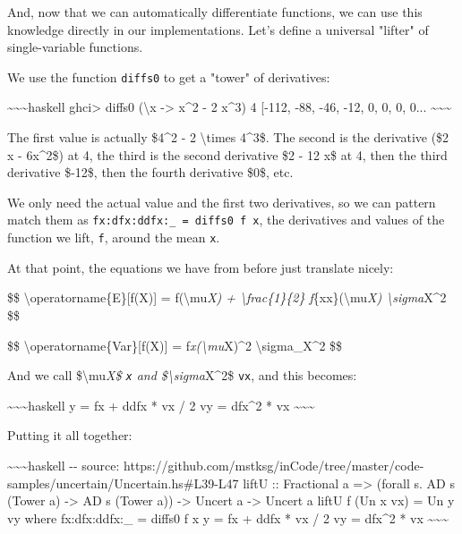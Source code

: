 \documentclass[]{article}
\begin{document}
And, now that we can automatically differentiate functions, we can use this
knowledge directly in our implementations. Let's define a universal "lifter" of
single-variable functions.

We use the function \texttt{diffs0} to get a "tower" of derivatives:

\textasciitilde{}\textasciitilde{}\textasciitilde{}haskell ghci\textgreater{}
diffs0 (\textbackslash{}x -\textgreater{} x\^{}2 - 2 x\^{}3) 4 {[}-112, -88,
-46, -12, 0, 0, 0, 0... \textasciitilde{}\textasciitilde{}\textasciitilde{}

The first value is actually \$4\^{}2 - 2 \textbackslash{}times 4\^{}3\$. The
second is the derivative (\$2 x - 6x\^{}2\$) at 4, the third is the second
derivative \$2 - 12 x\$ at 4, then the third derivative \$-12\$, then the fourth
derivative \$0\$, etc.

We only need the actual value and the first two derivatives, so we can pattern
match them as \texttt{fx:dfx:ddfx:\_\ =\ diffs0\ f\ x}, the derivatives and
values of the function we lift, \texttt{f}, around the mean \texttt{x}.

At that point, the equations we have from before just translate nicely:

\$\$ \textbackslash{}operatorname\{E\}{[}f(X){]} = f(\textbackslash{}mu\emph{X)
+ \textbackslash{}frac\{1\}\{2\} f}\{xx\}(\textbackslash{}mu\emph{X)
\textbackslash{}sigma}X\^{}2 \$\$

\$\$ \textbackslash{}operatorname\{Var\}{[}f(X){]} =
f\emph{x(\textbackslash{}mu}X)\^{}2 \textbackslash{}sigma\_X\^{}2 \$\$

And we call \$\textbackslash{}mu\emph{X\$ \texttt{x} and
\$\textbackslash{}sigma}X\^{}2\$ \texttt{vx}, and this becomes:

\textasciitilde{}\textasciitilde{}\textasciitilde{}haskell y = fx + ddfx * vx /
2 vy = dfx\^{}2 * vx \textasciitilde{}\textasciitilde{}\textasciitilde{}

Putting it all together:

\textasciitilde{}\textasciitilde{}\textasciitilde{}haskell -\/- source:
https://github.com/mstksg/inCode/tree/master/code-samples/uncertain/Uncertain.hs\#L39-L47
liftU :: Fractional a =\textgreater{} (forall s. AD s (Tower a) -\textgreater{}
AD s (Tower a)) -\textgreater{} Uncert a -\textgreater{} Uncert a liftU f (Un x
vx) = Un y vy where fx:dfx:ddfx:\_ = diffs0 f x y = fx + ddfx * vx / 2 vy =
dfx\^{}2 * vx \textasciitilde{}\textasciitilde{}\textasciitilde{}
\end{document}
